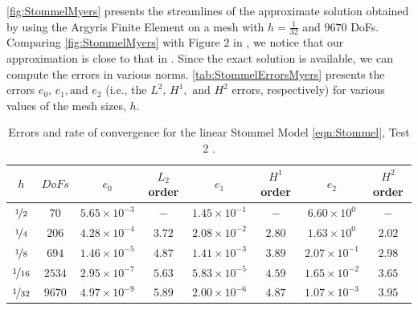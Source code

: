 \autoref{fig:StommelMyers} presents the streamlines of the approximate solution
obtained by using the Argyris Finite Element on a mesh with $h=\frac{1}{32}$ and
$9670$ DoFs. Comparing \autoref{fig:StommelMyers} with Figure $2$ in
\cite{Myers}, we notice that our approximation is close to that in \cite{Myers}.
Since the exact solution is available, we can compute the errors in various
norms. \autoref{tab:StommelErrorsMyers} presents the errors $e_0,\, e_1, \text{
and } e_2$ (i.e., the $L^2,\, H^1, \text{ and } H^2$ errors, respectively) for
various values of the mesh sizes, $h$.

\begin{table}%
\begin{center}
\begin{tabular}{|c|c|c|c|c|c|c|c|}%
  \hline
  $h$ & $DoFs$ & $e_0$ & $L_2$ order & $e_1$ & $H^1$ order & $e_2$ & $H^2$ order \\[0.2em] %
  \hline
  $\nicefrac{1}{2}$ & $70$ & $5.65\times 10^{-3}$ & $-$ & $1.45\times 10^{-1}$ & $-$ & $6.60\times 10^0$ & $-$ \\[0.2em] %
  $\nicefrac{1}{4}$ & $206$ & $4.28\times 10^{-4}$ & $3.72$ & $2.08\times 10^{-2}$ & $2.80$ & $1.63\times 10^0$ & $2.02$ \\[0.2em] %
  $\nicefrac{1}{8}$ & $694$ & $1.46\times 10^{-5}$ & $4.87$ & $1.41\times 10^{-3}$ & $3.89$ & $2.07\times 10^{-1}$ & $2.98$ \\[0.2em] %
  $\nicefrac{1}{16}$ & $2534$ & $2.95\times 10^{-7}$ & $5.63$ & $5.83\times 10^{-5}$ & $4.59$ & $1.65\times 10^{-2}$ & $3.65$ \\[0.2em] %
  $\nicefrac{1}{32}$ & $9670$ & $4.97\times 10^{-9}$ & $5.89$ & $2.00\times 10^{-6}$ & $4.87$ & $1.07\times 10^{-3}$ & $3.95$ \\[0.2em] %
  \hline
\end{tabular}
\end{center}
\caption{Errors and rate of convergence for the linear Stommel Model
  \eqref{eqn:Stommel}, Test 2 \cite{Myers}.}
\label{tab:StommelErrorsMyers}
\end{table}

